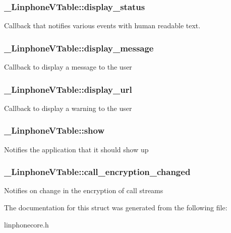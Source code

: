 \subsubsection[{display\-\_\-status}]{ {\bf \-\_\-\-Linphone\-V\-Table\-::display\-\_\-status}}\label{struct__LinphoneVTable_a159387507fc3312f7bba2e738e745ced}
\-Callback that notifies various events with human readable text. 
\subsubsection[{display\-\_\-message}]{ {\bf \-\_\-\-Linphone\-V\-Table\-::display\-\_\-message}}\label{struct__LinphoneVTable_ae4efb39479925ffc84c82b9e3754ae81}
\-Callback to display a message to the user 
\subsubsection[{display\-\_\-url}]{ {\bf \-\_\-\-Linphone\-V\-Table\-::display\-\_\-url}}\label{struct__LinphoneVTable_a311647b225c3c2defbe3fb87d7ce371c}
\-Callback to display a warning to the user 
\subsubsection[{show}]{ {\bf \-\_\-\-Linphone\-V\-Table\-::show}}\label{struct__LinphoneVTable_aeee04a1e163e352b8c730a934ebeff5a}
\-Notifies the application that it should show up 
\subsubsection[{call\-\_\-encryption\-\_\-changed}]{ {\bf \-\_\-\-Linphone\-V\-Table\-::call\-\_\-encryption\-\_\-changed}}\label{struct__LinphoneVTable_a472f1875e68f3f536681281bf0deb4bd}
\-Notifies on change in the encryption of call streams 

\-The documentation for this struct was generated from the following file\-:\begin{DoxyCompactItemize}
\item 
linphonecore.\-h\end{DoxyCompactItemize}
